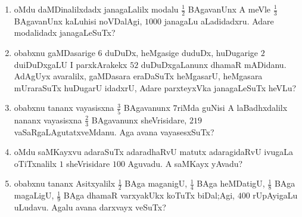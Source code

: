 \begin{enumerate}[\rm(1)]
\item oMdu daMDinalilxdadx janagaLalilx modalu $\tfrac{1}{2}$ BAgavanUnx A meVle $\tfrac{1}{3}$ BAgavanUnx kaLuhisi noVDalAgi, $1000$ janagaLu aLadidadxru. Adare modalidadx janagaLeSuTx?

\item obabxnu gaMDasarige $6$ duDuDx, heMgasige duduDx, huDugarige $2$ duiDuDxgaLU I parxkArakekx $52$ duDuDxgaLanunx dhamaR mADidanu. AdAgUyx avaralilx, gaMDasara eraDaSuTx heMgasarU, heMgasara mUraraSuTx huDugarU idadxrU, Adare parxteyxVka janagaLeSuTx heVLu?

\item obabxnu tananx  vayasisxna $\tfrac{3}{5}$ BAgavanunx $7$riMda guNisi A laBadhxdalilx nananx vayasisxna $\frac{2}{3}$ BAgavanunx sheVrisidare, $219$ vaSaRgaLAgutatxveMdanu. Aga avana vayasesxSuTx?

\item oMdu saMKayxvu adaraSuTx adaradhaRvU matutx adaragidaRvU ivugaLa oTiTxnalilx $1$ sheVrisidare $100$ Aguvadu. A saMKayx yAvadu?

\item obabxnu tananx Asitxyalilx $\tfrac{1}{2}$ BAga maganigU, $\tfrac{1}{4}$ BAga heMDatigU, $\tfrac{1}{8}$ BAga magaLigU, $\tfrac{1}{9}$ BAga dhamaR varxyakUkx koTuTx biDal;Agi, $400$ rUpAyigaLu uLudavu. Agalu avana darxvayx veSuTx?
\end{enumerate}

